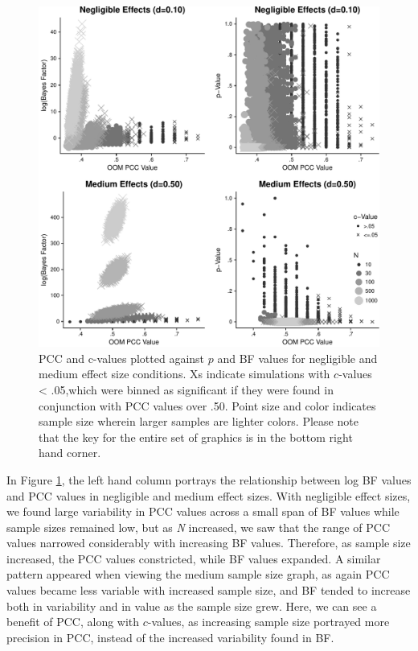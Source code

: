 \documentclass[english,man]{apa6}
\theoremstyle{definition}
\theoremstyle{definition}
\theoremstyle{definition}
\theoremstyle{remark}
\begin{document}
\begin{figure}
\centering
\includegraphics{alt_nhst_FINAL_files/figure-latex/pcc-bf-fig-1.pdf}
\caption{\label{fig:pcc-bf-fig}PCC and c-values plotted against \(p\) and BF
values for negligible and medium effect size conditions. Xs indicate
simulations with \(c\)-values \textless{} .05,which were binned as
significant if they were found in conjunction with PCC values over .50.
Point size and color indicates sample size wherein larger samples are
lighter colors. Please note that the key for the entire set of graphics
is in the bottom right hand corner.}
\end{figure}

In Figure \ref{fig:pcc-bf-fig}, the left hand column portrays the
relationship between log BF values and PCC values in negligible and
medium effect sizes. With negligible effect sizes, we found large
variability in PCC values across a small span of BF values while sample
sizes remained low, but as \emph{N} increased, we saw that the range of
PCC values narrowed considerably with increasing BF values. Therefore,
as sample size increased, the PCC values constricted, while BF values
expanded. A similar pattern appeared when viewing the medium sample size
graph, as again PCC values became less variable with increased sample
size, and BF tended to increase both in variability and in value as the
sample size grew. Here, we can see a benefit of PCC, along with
\(c\)-values, as increasing sample size portrayed more precision in PCC,
instead of the increased variability found in BF.
\end{document}

